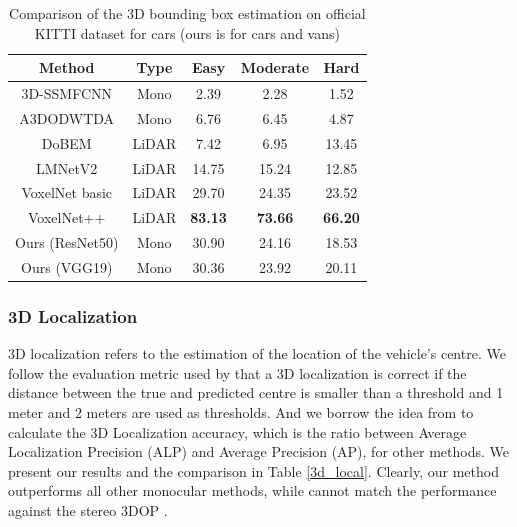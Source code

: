 \documentclass[a4paper,12pt]{article}
\begin{document}
\begin{table}[H]
	\centering
	\caption[Comparison of the 3D bounding box estimation performance.]{Comparison of the 3D bounding box estimation on official KITTI dataset for cars (ours is for cars and vans)}
	\label{3D_vehicle_detection}
	\begin{tabular}{|c|c|c|c|c|}
		\hline
		Method                                                                   & Type  & Easy           & Moderate       & Hard           \\ \hline
		3D-SSMFCNN \cite{novakmaster2017}                       & Mono  & 2.39           & 2.28           & 1.52           \\ \hline
		A3DODWTDA \cite{erino397fregu856master2018}             & Mono  & 6.76           & 6.45           & 4.87           \\ \hline
		DoBEM \cite{8088147}                                    & LiDAR & 7.42           & 6.95           & 13.45          \\ \hline
		LMNetV2 \cite{2018arXiv180504902M}                      & LiDAR & 14.75          & 15.24          & 12.85          \\ \hline
		VoxelNet basic \cite{DBLP:journals/corr/abs-1711-06396} & LiDAR & 29.70          & 24.35          & 23.52          \\ \hline
		VoxelNet++ \cite{DBLP:journals/corr/abs-1711-06396}     & LiDAR & \textbf{83.13} & \textbf{73.66} & \textbf{66.20} \\ \hline
		Ours (ResNet50)                                                          & Mono  & 30.90          & 24.16          & 18.53          \\ \hline
		Ours (VGG19)																& Mono	& 30.36	& 23.92	& 20.11 \\ \hline
		
	\end{tabular}
\end{table}


\subsubsection{3D Localization}
3D localization refers to the estimation of the location of the vehicle's centre. We follow the evaluation metric used by \cite{DBLP:journals/corr/MousavianAFK16, DBLP:journals/corr/ChabotCRTC17} that a 3D localization is correct if the distance between the true and predicted centre is smaller than a threshold and 1 meter and 2 meters are used as thresholds. And we borrow the idea from \cite{DBLP:journals/corr/MousavianAFK16} to calculate the 3D Localization accuracy, which is the ratio between Average Localization Precision (ALP) and Average Precision (AP), for other methods. We present our results and the comparison in Table \ref{3d_local}. Clearly, our method outperforms all other monocular methods, while cannot match the performance against the stereo 3DOP \cite{Chen:2015:OPA:2969239.2969287}.
\end{document}
